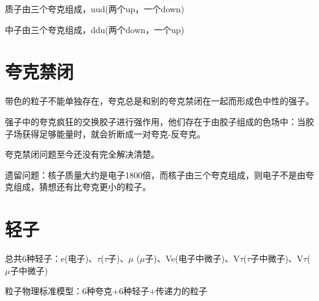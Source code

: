 质子由三个夸克组成，uud(两个up，一个down)

中子由三个夸克组成，ddu(两个down，一个up)

\section{夸克禁闭}

带色的粒子不能单独存在，夸克总是和别的夸克禁闭在一起而形成色中性的强子。

强子中的夸克疯狂的交换胶子进行强作用，他们存在于由胶子组成的色场中：当胶子场获得足够能量时，就会折断成一对夸克-反夸克。

夸克禁闭问题至今还没有完全解决清楚。

遗留问题：核子质量大约是电子1800倍，而核子由三个夸克组成，则电子不是由夸克组成，猜想还有比夸克更小的粒子。

\section{轻子}

总共6种轻子：e(电子)、$\tau$($\tau$子)、$\mu$ ($\mu$子)、Ve(电子中微子)、V$\tau$($\tau$子中微子)、V$\tau$($\mu$子中微子)

粒子物理标准模型：6种夸克+6种轻子+传递力的粒子

\clearpage
